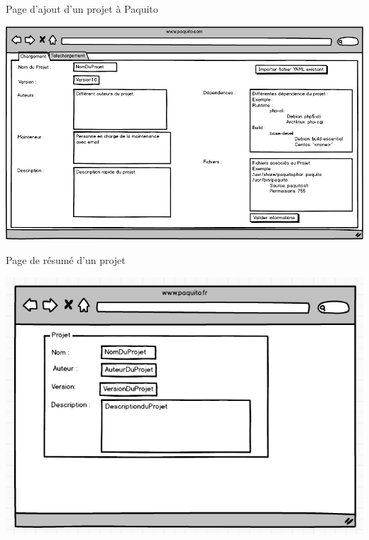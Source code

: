 \documentclass[9pt,xcolor=dvipsnames]{beamer}
\begin{document}
\begin{frame}{Page d'ajout d'un projet à Paquito}
  \begin{center}
    \includegraphics[scale=0.4]{../img/ajouterProjet.png}
  \end{center}
\end{frame}

\begin{frame}{Page de résumé d'un projet}
  \begin{center}
    \includegraphics[scale=\largeur]{../img/resumeProjet.png}
  \end{center}
\end{frame}
\end{document}
